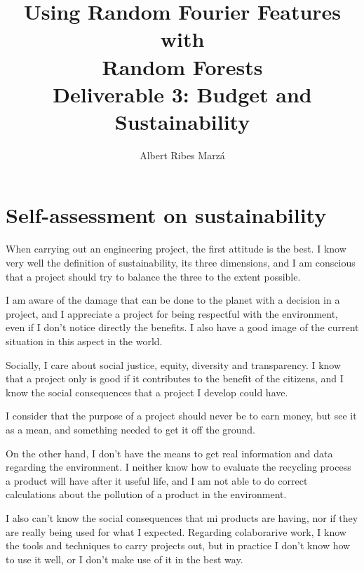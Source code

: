 \documentclass[a4paper]{article}
\title{
Using Random Fourier Features with \\ Random Forests \\
\large Deliverable 3: Budget and Sustainability}
\author{Albert Ribes Marzá}
\begin{document}
    \maketitle
    \pagebreak

    \tableofcontents
    \pagebreak


    \section{Self-assessment on sustainability}



%

When carrying out an engineering project, the first attitude is the best. I know very well the definition of sustainability, its three dimensions, and I am conscious that a project should try to balance the three to the extent possible.

I am aware of the damage that can be done to the planet with a decision in a project, and I appreciate a project for being respectful with the environment, even if I don't notice directly the benefits. I also have a good image of the current situation in this aspect in the world.

Socially, I care about social justice, equity, diversity and transparency. I know that a project only is good if it contributes to the benefit of the citizens, and I know the social consequences that a project I develop could have.

I consider that the purpose of a project should never be to earn money, but see it as a mean, and something needed to get it off the ground.

On the other hand, I don't have the means to get real information and data regarding the environment. I neither know how to evaluate the recycling process a product will have after it useful life, and I am not able to do correct calculations about the pollution of a product in the environment.

I also can't know the social consequences that mi products are having, nor if they are really being used for what I expected. Regarding colaborarive work, I know the tools and techniques to carry projects out, but in practice I don't know how to use it well, or I don't make use of it in the best way.
\end{document}
